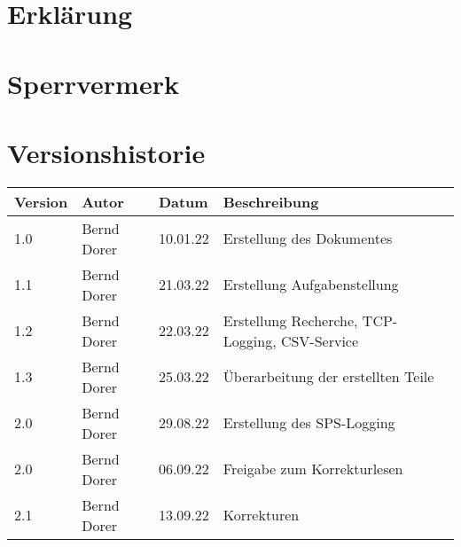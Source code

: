 \documentclass[
   ngerman          %
  ,a4paper          %
 ,12pt
]{article} %
\begin{document}



\setlength{\skip\footins}{1cm}



%
%
\section*{Erklärung}


\textbf{\vspace*{4cm}}
%
%
\section*{Sperrvermerk}

\newpage




%
%
\section*{Versionshistorie}
\begin{center}
	\begin{tabular}{|p{2cm}|p{3.5cm}|p{2cm}|p{6.5cm}|}
		\hline
		 \textbf{Version} &  \textbf{Autor} &  \textbf{Datum} &  \textbf{Beschreibung} \\
		\hline
		1.0 & Bernd Dorer & 10.01.22 & Erstellung des Dokumentes\\
		1.1 & Bernd Dorer & 21.03.22 & Erstellung Aufgabenstellung\\
		1.2 & Bernd Dorer & 22.03.22 & Erstellung Recherche, TCP-Logging, CSV-Service \\
		1.3 & Bernd Dorer & 25.03.22 & Überarbeitung der erstellten Teile\\
		2.0 & Bernd Dorer & 29.08.22 & Erstellung des SPS-Logging\\
		2.0 & Bernd Dorer & 06.09.22 & Freigabe zum Korrekturlesen\\
		2.1 & Bernd Dorer & 13.09.22 & Korrekturen\\
		\hline
	\end{tabular}
\end{center}
\null\newpage
\end{document}
